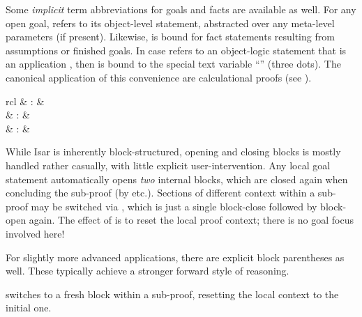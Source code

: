 \begin{isabellebody}
\begin{isamarkuptext}
  Some \emph{implicit} term abbreviations
  for goals and facts are available as well.  For any open goal,
  \mbox{} refers to its object-level statement,
  abstracted over any meta-level parameters (if present).  Likewise,
  \mbox{} is bound for fact statements resulting from
  assumptions or finished goals.  In case \mbox{} refers to
  an object-logic statement that is an application , then
   is bound to the special text variable ``\mbox{\isa{{\isasymdots}}}''
  (three dots).  The canonical application of this convenience are
  calculational proofs (see ).%
\end{isamarkuptext}%
\isamarkuptrue%
%
\isamarkuptrue%
%
\begin{isamarkuptext}%
\begin{matharray}{rcl}
    \mbox{} & : &  \\
    \mbox{\isa{\isacommand{{\isacharbraceleft}}}} & : &  \\
    \mbox{\isa{\isacommand{{\isacharbraceright}}}} & : &  \\
  \end{matharray}

  While Isar is inherently block-structured, opening and closing
  blocks is mostly handled rather casually, with little explicit
  user-intervention.  Any local goal statement automatically opens
  \emph{two} internal blocks, which are closed again when concluding
  the sub-proof (by \mbox{} etc.).  Sections of different
  context within a sub-proof may be switched via \mbox{},
  which is just a single block-close followed by block-open again.
  The effect of \mbox{} is to reset the local proof context;
  there is no goal focus involved here!

  For slightly more advanced applications, there are explicit block
  parentheses as well.  These typically achieve a stronger forward
  style of reasoning.

  \begin{descr}

  \item [\mbox{\isa{\isacommand{next}}}] switches to a fresh block within a
  sub-proof, resetting the local context to the initial one.


\end{descr}
\end{isamarkuptext}
\end{isabellebody}
